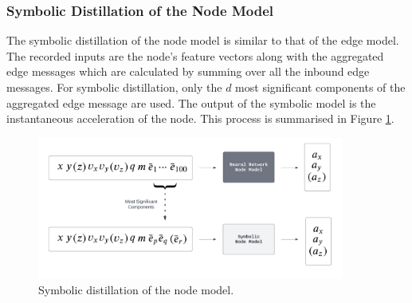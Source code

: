 \documentclass[11pt]{article}
\begin{document}
\subsubsection{Symbolic Distillation of the Node Model}
The symbolic distillation of the node model is similar to that of the edge model. The recorded inputs are the node's feature vectors along with the aggregated edge messages which are calculated by summing over all the inbound edge messages. For symbolic distillation, only the $d$ most significant components of the aggregated edge message are used. The output of the symbolic model is the instantaneous acceleration of the node. This process is summarised in Figure \ref{fig:node_model_symbolic_distillation}.
\begin{figure}[H]
    \centering
    \includegraphics[width=0.9\textwidth]{figs/node_distillation.png}
    \caption{Symbolic distillation of the node model.}
    \label{fig:node_model_symbolic_distillation}
\end{figure}
\end{document}

